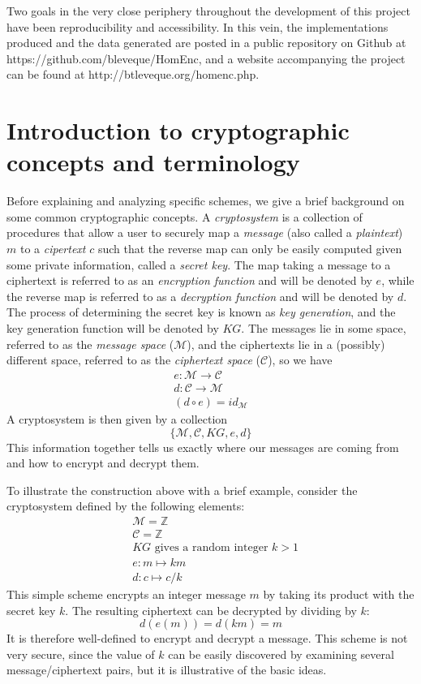 \documentclass[11pt]{report}
\newcommand{\Z}{\mathbb{Z}}
\newcommand{\M}{\mathcal{M}}
\newcommand{\lra}{\longrightarrow}
\begin{document}
Two goals in the very close periphery throughout the development of this project have been reproducibility and accessibility. In this vein, the implementations produced and the data generated are posted in a public repository on Github at https://github.com/bleveque/HomEnc, and a website accompanying the project can be found at http://btleveque.org/homenc.php.

\section{Introduction to cryptographic concepts and terminology} 

Before explaining and analyzing specific schemes, we give a brief background on some common cryptographic concepts. A \emph{cryptosystem} is a collection of procedures that allow a user to securely map a \emph{message} (also called a \emph{plaintext}) $m$ to a \emph{cipertext} $c$ such that the reverse map can only be easily computed given some private information, called a \emph{secret key}. The map taking a message to a ciphertext is referred to as an \emph{encryption function} and will be denoted by $e$, while the reverse map is referred to as a \emph{decryption function} and will be denoted by $d$. The process of determining the secret key is known as \emph{key generation}, and the key generation function will be denoted by $KG$. The messages lie in some space, referred to as the \emph{message space} ($\M$), and the ciphertexts lie in a (possibly) different space, referred to as the \emph{ciphertext space} ($\mathcal{C}$), so we have
\begin{align*}
e: \M \lra \mathcal{C} \\
d: \mathcal{C} \lra \M \\
(d\circ e) = id_{\M}
\end{align*}
A cryptosystem is then given by a collection \[\{\M, \mathcal{C},  KG, e, d\}\] This information together tells us exactly where our messages are coming from and how to encrypt and decrypt them.

\label{Example1}To illustrate the construction above with a brief example, consider the cryptosystem defined by the following elements:
\begin{align*}
&\M = \Z \\
&\mathcal{C} = \Z \\
&KG \text{ gives a random integer } k>1 \\
&e: m \mapsto km \\
&d: c \mapsto c/k
\end{align*}
\noindent This simple scheme encrypts an integer message $m$ by taking its product with the secret key $k$. The resulting ciphertext can be decrypted by dividing by $k$: \[d(e(m)) = d(km) = m\] It is therefore well-defined to encrypt and decrypt a message. This scheme is not very secure, since the value of $k$ can be easily discovered by examining several message/ciphertext pairs, but it is illustrative of the basic ideas.
\end{document}
